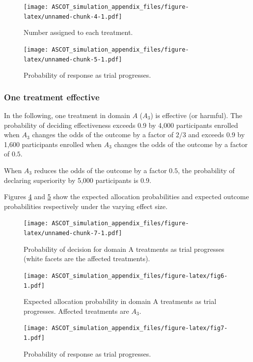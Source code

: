 \documentclass[
]{article}
\begin{document}
\begin{figure}
\centering
\texttt{[image: ASCOT\_simulation\_appendix\_files/figure-latex/unnamed-chunk-4-1.pdf]}
\caption{\label{fig:unnamed-chunk-4}Number assigned to each treatment.}
\end{figure}

\begin{figure}
\centering
\texttt{[image: ASCOT\_simulation\_appendix\_files/figure-latex/unnamed-chunk-5-1.pdf]}
\caption{\label{fig:unnamed-chunk-5}Probability of response as trial progresses.}
\end{figure}

\clearpage

\hypertarget{one-treatment-effective}{%
\subsubsection{One treatment effective}\label{one-treatment-effective}}

In the following, one treatment in domain \(A\) (\(A_3\)) is effective (or harmful).
The probability of deciding effectiveness exceeds 0.9 by 4,000 participants enrolled when \(A_3\) changes the odds of the outcome by a factor of \(2/3\) and exceeds 0.9 by 1,600 participants enrolled when \(A_3\) changes the odds of the outcome by a factor of \(0.5\).

When \(A_3\) reduces the odds of the outcome by a factor \(0.5\), the probability of declaring superiority by 5,000 participants is 0.9.

Figures \ref{fig:fig6} and \ref{fig:fig7} show the expected allocation probabilities and expected outcome probabilities respectively under the varying effect size.

\begin{figure}
\centering
\texttt{[image: ASCOT\_simulation\_appendix\_files/figure-latex/unnamed-chunk-7-1.pdf]}
\caption{\label{fig:unnamed-chunk-7}Probability of decision for domain A treatments as trial progresses (white facets are the affected treatments).}
\end{figure}

\begin{figure}
\centering
\texttt{[image: ASCOT\_simulation\_appendix\_files/figure-latex/fig6-1.pdf]}
\caption{\label{fig:fig6}Expected allocation probability in domain A treatments as trial progresses. Affected treatments are \(A_3\).}
\end{figure}

\begin{figure}
\centering
\texttt{[image: ASCOT\_simulation\_appendix\_files/figure-latex/fig7-1.pdf]}
\caption{\label{fig:fig7}Probability of response as trial progresses.}
\end{figure}
\end{document}
